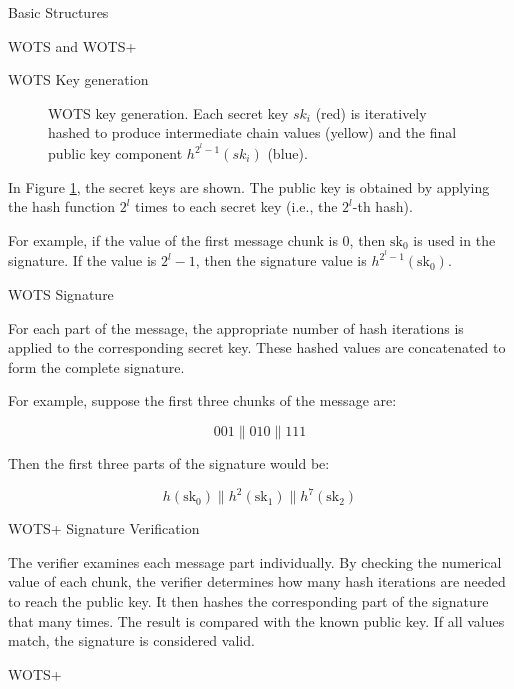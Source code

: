 \documentclass[version=preprint]{iacrcc}
\begin{document}
\begin{section}{Basic Structures}{\label{sec1}}
\begin{subsection}{WOTS and WOTS+}
\begin{subsubsection}{WOTS Key generation}
\begin{figure}[ht]
\begin{tikzpicture}
        \end{tikzpicture}
            \caption{WOTS key generation. Each secret key $\mathit{sk}_i$ (red) is iteratively hashed to produce intermediate chain values (yellow) and the final public key component $h^{2^l-1}(\mathit{sk}_i)$ (blue).}
            \label{fig:WOTS}
        \end{figure}

        In Figure \ref{fig:WOTS}, the secret keys are shown. The public key is obtained by applying the hash function \( 2^l \) times to each secret key (i.e., the \( 2^l \)-th hash). 

        For example, if the value of the first message chunk is 0, then \(\text{sk}_0\) is used in the signature. If the value is \( 2^l - 1 \), then the signature value is \( h^{2^l - 1}(\text{sk}_0) \).

        
    \end{subsubsection}

    \begin{subsubsection}{WOTS Signature}

        For each part of the message, the appropriate number of hash iterations is applied to the corresponding secret key. These hashed values are concatenated to form the complete signature.

        For example, suppose the first three chunks of the message are:
        
        \[
        001 \| 010 \| 111
        \]
        
        Then the first three parts of the signature would be:
        
        \[
        h(\text{sk}_0) \| h^2(\text{sk}_1) \| h^7(\text{sk}_2)
        \]
                
    \end{subsubsection}

    \begin{subsubsection}{WOTS+ Signature Verification}

        The verifier examines each message part individually. By checking the numerical value of each chunk, the verifier determines how many hash iterations are needed to reach the public key. It then hashes the corresponding part of the signature that many times. The result is compared with the known public key. If all values match, the signature is considered valid.
        
    \end{subsubsection}

    \begin{subsubsection}{WOTS+ \cite{cryptoeprint:2017/965}}


\end{subsubsection}
\end{subsection}
\end{section}
\end{document}
